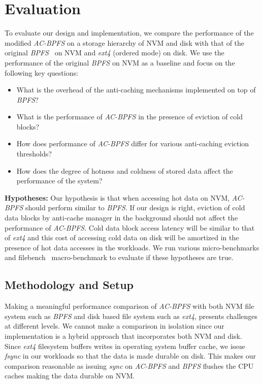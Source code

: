 \section{Evaluation}
To evaluate our design and implementation, we compare the performance of the modified \textit{AC-BPFS} on a storage hierarchy of NVM and disk with that of the original \textit{BPFS}~\cite{c10} on NVM and \textit{ext4} (ordered mode) on disk. We use the performance of the original \textit{BPFS} on NVM as a baseline and focus on the following key questions:

\begin{itemize}
\item What is the overhead of the anti-caching mechanisms implemented on top of \textit{BPFS}? \vspace{-0.1in}
\item What is the performance of \textit{AC-BPFS} in the presence of eviction of cold blocks? \vspace{-0.1in}
\item How does performance of \textit{AC-BPFS} differ for various anti-caching eviction thresholds? \vspace{-0.1in}
\item How does the degree of hotness and coldness of stored data affect the performance of the system? \vspace{-0.1in}
\end{itemize}

\textbf{Hypotheses:} Our hypothesis is that when accessing hot data on NVM, \textit{AC-BPFS} should perform similar to \textit{BPFS}. If our design is right, eviction of cold data blocks by anti-cache manager in the background should not affect the performance of \textit{AC-BPFS}. Cold data block access latency will be similar to that of \textit{ext4} and this cost of accessing cold data on disk will be amortized in the presence of hot data accesses in the workloads. We run various micro-benchmarks and filebench~\cite{filebench} macro-benchmark to evaluate if these hypotheses are true.

\subsection{Methodology and Setup}
Making a meaningful performance comparison of \textit{AC-BPFS} with both NVM file system such as \textit{BPFS} and disk based file system such as \textit{ext4}, presents challenges at different levels. We cannot make a comparison in isolation since our implementation is a hybrid approach that incorporates both NVM and disk. Since \textit{ext4} filesystem buffers writes in operating system buffer cache, we issue \textit{fsync} in our workloads so that the data is made durable on disk. This makes our comparison reasonable as issuing \textit{sync} on \textit{AC-BPFS} and \textit{BPFS} flushes the CPU caches making the data durable on NVM. 

